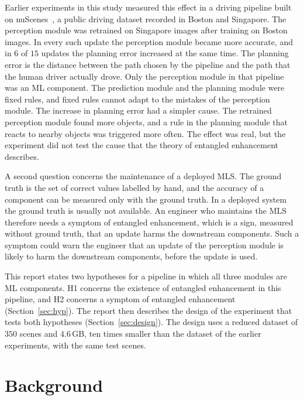 \documentclass[11pt,a4paper]{article}
\begin{document}
Earlier experiments in this study measured this effect in a driving
pipeline built on nuScenes~\cite{caesar2020nuscenes}, a public driving
dataset recorded in Boston and Singapore. The perception module was
retrained on Singapore images after training on Boston images. In every
such update the perception module became more accurate, and in $6$ of $15$
updates the planning error increased at the same time. The planning error
is the distance between the path chosen by the pipeline and the path that
the human driver actually drove. Only the perception
module in that pipeline was an ML component. The prediction module and the
planning module were fixed rules, and fixed rules cannot adapt to the
mistakes of the perception module. The increase in planning error had a
simpler cause. The retrained perception module found more objects, and a
rule in the planning module that reacts to nearby objects was triggered
more often. The effect was real, but the experiment did not test the cause
that the theory of entangled enhancement describes.

A second question concerns the maintenance of a deployed MLS. The ground
truth is the set of correct values labelled by hand, and the accuracy of a
component can be measured only with the ground truth. In a deployed system
the ground truth is usually not available. An engineer who maintains the
MLS therefore needs a symptom of entangled enhancement, which is a sign,
measured without ground truth, that an update harms the downstream
components. Such a symptom could warn the engineer that an update of the
perception module is likely to harm the downstream components, before the
update is used.

This report states two hypotheses for a pipeline in which all three
modules are ML components. H1 concerns the existence of entangled
enhancement in this pipeline, and H2 concerns a symptom of entangled
enhancement (Section~\ref{sec:hyp}). The report
then describes the design of the experiment that tests both hypotheses
(Section~\ref{sec:design}). The design uses a reduced dataset of $350$
scenes and $4.6$\,GB, ten times smaller than the dataset of the earlier
experiments, with the same test scenes.

\section{Background}
\label{sec:background}
\end{document}
